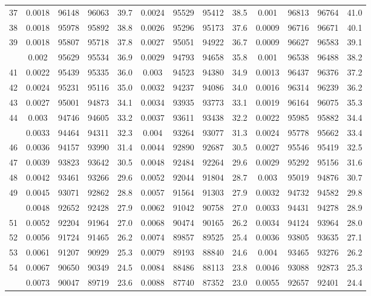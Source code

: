 \documentclass[
  14pt,
]{article}
\begin{document}
\begin{longtable}[t]{lcccccccccccc}
37 & 0.0018 & 96148 & 96063 & 39.7 & 0.0024 & 95529 & 95412 & 38.5 & 0.001 & 96813 & 96764 & 41.0\\
38 & 0.0018 & 95978 & 95892 & 38.8 & 0.0026 & 95296 & 95173 & 37.6 & 0.0009 & 96716 & 96671 & 40.1\\
39 & 0.0018 & 95807 & 95718 & 37.8 & 0.0027 & 95051 & 94922 & 36.7 & 0.0009 & 96627 & 96583 & 39.1\\
\addlinespace
40 & 0.002 & 95629 & 95534 & 36.9 & 0.0029 & 94793 & 94658 & 35.8 & 0.001 & 96538 & 96488 & 38.2\\
41 & 0.0022 & 95439 & 95335 & 36.0 & 0.003 & 94523 & 94380 & 34.9 & 0.0013 & 96437 & 96376 & 37.2\\
42 & 0.0024 & 95231 & 95116 & 35.0 & 0.0032 & 94237 & 94086 & 34.0 & 0.0016 & 96314 & 96239 & 36.2\\
43 & 0.0027 & 95001 & 94873 & 34.1 & 0.0034 & 93935 & 93773 & 33.1 & 0.0019 & 96164 & 96075 & 35.3\\
44 & 0.003 & 94746 & 94605 & 33.2 & 0.0037 & 93611 & 93438 & 32.2 & 0.0022 & 95985 & 95882 & 34.4\\
\addlinespace
45 & 0.0033 & 94464 & 94311 & 32.3 & 0.004 & 93264 & 93077 & 31.3 & 0.0024 & 95778 & 95662 & 33.4\\
46 & 0.0036 & 94157 & 93990 & 31.4 & 0.0044 & 92890 & 92687 & 30.5 & 0.0027 & 95546 & 95419 & 32.5\\
47 & 0.0039 & 93823 & 93642 & 30.5 & 0.0048 & 92484 & 92264 & 29.6 & 0.0029 & 95292 & 95156 & 31.6\\
48 & 0.0042 & 93461 & 93266 & 29.6 & 0.0052 & 92044 & 91804 & 28.7 & 0.003 & 95019 & 94876 & 30.7\\
49 & 0.0045 & 93071 & 92862 & 28.8 & 0.0057 & 91564 & 91303 & 27.9 & 0.0032 & 94732 & 94582 & 29.8\\
\addlinespace
50 & 0.0048 & 92652 & 92428 & 27.9 & 0.0062 & 91042 & 90758 & 27.0 & 0.0033 & 94431 & 94278 & 28.9\\
51 & 0.0052 & 92204 & 91964 & 27.0 & 0.0068 & 90474 & 90165 & 26.2 & 0.0034 & 94124 & 93964 & 28.0\\
52 & 0.0056 & 91724 & 91465 & 26.2 & 0.0074 & 89857 & 89525 & 25.4 & 0.0036 & 93805 & 93635 & 27.1\\
53 & 0.0061 & 91207 & 90929 & 25.3 & 0.0079 & 89193 & 88840 & 24.6 & 0.004 & 93465 & 93276 & 26.2\\
54 & 0.0067 & 90650 & 90349 & 24.5 & 0.0084 & 88486 & 88113 & 23.8 & 0.0046 & 93088 & 92873 & 25.3\\
\addlinespace
55 & 0.0073 & 90047 & 89719 & 23.6 & 0.0088 & 87740 & 87352 & 23.0 & 0.0055 & 92657 & 92401 & 24.4\\

\end{longtable}
\end{document}
